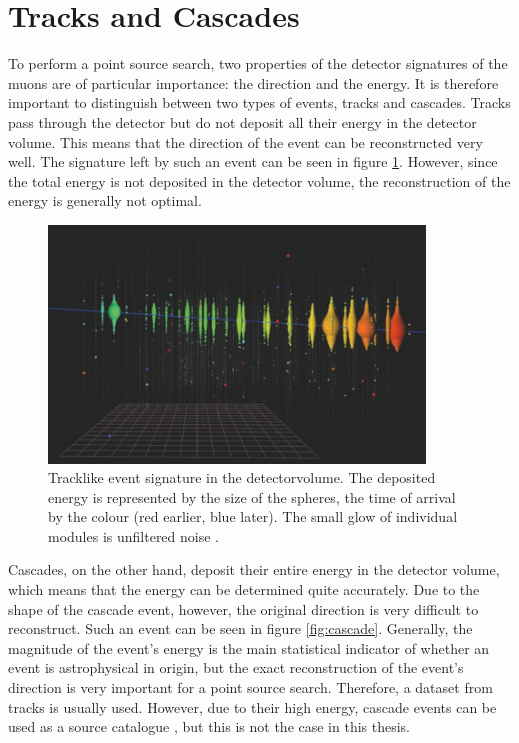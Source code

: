\section{Tracks and Cascades}

To perform a point source search, two properties of the detector signatures of the muons are of particular importance: the direction and the energy.
It is therefore important to distinguish between two types of events, tracks and cascades.
Tracks pass through the detector but do not deposit all their energy in the detector volume.
This means that the direction of the event can be reconstructed very well.
The signature left by such an event can be seen in figure \ref{fig:track}.
However, since the total energy is not deposited in the detector volume, the reconstruction of the energy is generally not optimal.
\begin{figure}
    \centering
    \includegraphics[width=10cm]{Plots/01_7_icecube/track.png}
    \caption{Tracklike event signature in the detectorvolume. The deposited energy is represented by the size of the spheres, the time of arrival by the colour (red earlier, blue later). The small glow of individual modules is unfiltered noise \cite{spiering}.}
    \label{fig:track}
\end{figure}
Cascades, on the other hand, deposit their entire energy in the detector volume, which means that the energy can be determined quite accurately.
Due to the shape of the cascade event, however, the original direction is very difficult to reconstruct.
Such an event can be seen in figure \ref{fig:cascade}.
Generally, the magnitude of the event's energy is the main statistical indicator of whether an event is astrophysical in origin, but the exact reconstruction of the event's direction is very important for a point source search.
Therefore, a dataset from tracks is usually used.
However, due to their high energy, cascade events can be used as a source catalogue \cite{steve_und_mirco}, but this is not the case in this thesis.
